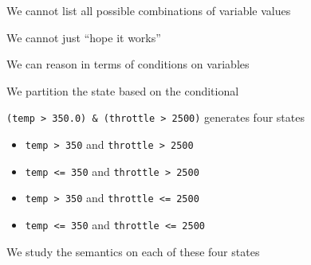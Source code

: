 \documentclass{beamer}
\newcommand{\red}[1]{
\textcolor{red}{#1}
}
\begin{document}
\begin{slide}{
\item We cannot list all possible combinations of variable values
\item We cannot just ``hope it works''
\pause
\item We can reason in terms of conditions on variables
}\end{slide}

\begin{slide}{
\item We partition the state based on the conditional
\item \texttt{(temp > 350.0) \& (throttle > 2500)} generates four states
\begin{itemize}
\item \texttt{temp > 350} and \texttt{throttle > 2500}
\item \texttt{temp <= 350} and \texttt{throttle > 2500}
\item \texttt{temp > 350} and \texttt{throttle <= 2500}
\item \texttt{temp <= 350} and \texttt{throttle <= 2500}
\end{itemize}
\item We study the semantics on each of these four states
}\end{slide}

\end{document}
